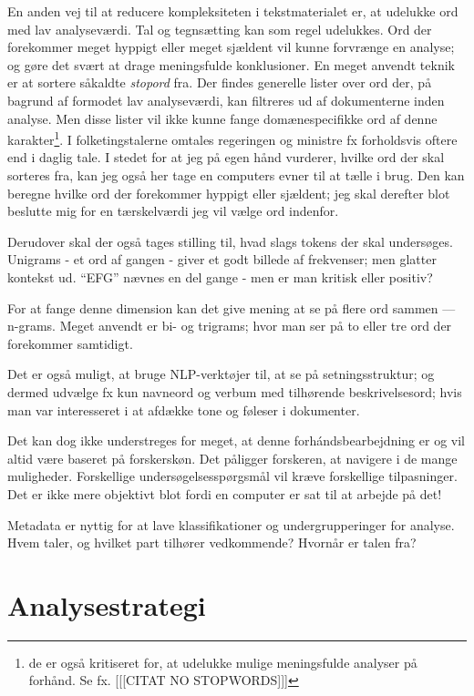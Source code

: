 En anden vej til at reducere kompleksiteten i tekstmaterialet er, at udelukke ord med lav analyseværdi.
Tal og tegnsætting kan som regel udelukkes.
Ord der forekommer meget hyppigt eller meget sjældent vil kunne forvrænge en analyse; og gøre det svært at drage meningsfulde konklusioner.
En meget anvendt teknik er at sortere såkaldte \textit{stopord} fra.
Der findes generelle lister over ord der, på bagrund af formodet lav analyseværdi, kan filtreres ud af dokumenterne inden analyse.
Men disse lister vil ikke kunne fange domænespecifikke ord af denne karakter\footnote{de er også kritiseret for, at udelukke mulige meningsfulde analyser på forhånd. Se fx. [[[CITAT NO STOPWORDS]]]}.
I folketingstalerne omtales regeringen og ministre fx forholdsvis oftere end i daglig tale.
I stedet for at jeg på egen hånd vurderer, hvilke ord der skal sorteres fra, kan jeg også her tage en computers evner til at tælle i brug.
Den kan beregne hvilke ord der forekommer hyppigt eller sjældent; jeg skal derefter blot beslutte mig for en tærskelværdi jeg vil vælge ord indenfor.

Derudover skal der også tages stilling til, hvad slags tokens der skal undersøges.
Unigrams - et ord af gangen - giver et godt billede af frekvenser; men glatter kontekst ud.
“EFG” nævnes en del gange - men er man kritisk eller positiv?

For at fange denne dimension kan det give mening at se på flere ord sammen — n-grams.
Meget anvendt er bi- og trigrams; hvor man ser på to eller tre ord der forekommer samtidigt.

Det er også muligt, at bruge NLP-verktøjer til, at se på setningsstruktur; og dermed udvælge fx kun navneord og verbum med tilhørende beskrivelsesord; hvis man var interesseret i at afdække tone og føleser i dokumenter.

Det kan dog ikke understreges for meget, at denne forhándsbearbejdning er og vil altid være baseret på forskerskøn.
Det påligger forskeren, at navigere i de mange muligheder.
Forskellige undersøgelsesspørgsmål vil kræve forskellige tilpasninger.
Det er ikke mere objektivt blot fordi en computer er sat til at arbejde på det!

Metadata er nyttig for at lave klassifikationer og undergrupperinger for analyse.
Hvem taler, og hvilket part tilhører vedkommende?
Hvornår er talen fra?


\chapter{Analysestrategi}\label{chap:strategy}


